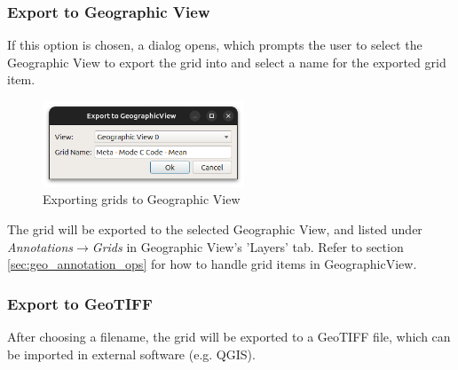 \subsubsection{Export to Geographic View}
\label{sec:grid_export_geographic}

If this option is chosen, a dialog opens, which prompts the user to select the Geographic View to export the grid into and 
select a name for the exported grid item.

\begin{figure}[H]
    \center
    \includegraphics[width=6cm,frame]{figures/grid_export_geographic.png}
  \caption{Exporting grids to Geographic View}
\end{figure}

The grid will be exported to the selected Geographic View, and listed under \textit{Annotations}$\rightarrow$\textit{Grids} in Geographic View's 'Layers' tab.
Refer to section \ref{sec:geo_annotation_ops} for how to handle grid items in GeographicView.

\subsubsection{Export to GeoTIFF}

After choosing a filename, the grid will be exported to a GeoTIFF file, which can be imported in external software (e.g. QGIS).





